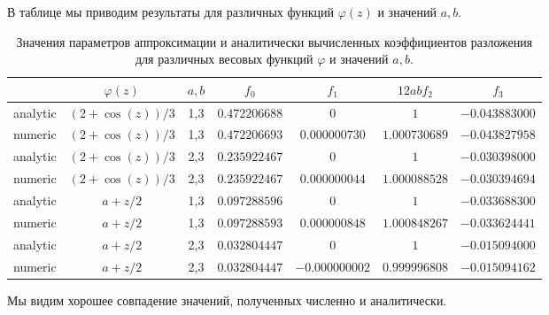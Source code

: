 \documentclass{article}
\begin{document}
В таблице мы приводим результаты для различных функций  $\varphi(z)$ и значений $a,b$.
\begin{table}[htpb]
\begin{center}
\begin{tabular}{c|cccccc}
  & $\varphi(z)$ & $a,b$ & $f_{0}$ &  $f_{1}$ &  $12ab f_{2}$ &  $f_{3}$ \\
 \hline
 analytic & $(2+\cos(z))/3$ & 1,3 & $0.472206688$ & $0$ & $1$&$-0.043883000$\\
 numeric & $(2+\cos(z))/3$ & 1,3 &  $0.472206693$ & $0.000000730$ & $1.000730689$&$-0.043827958$\\
  \hline
 analytic & $(2+\cos(z))/3$ & 2,3 & $0.235922467$ & $0$ & $1$&$-0.030398000$\\
 numeric & $(2+\cos(z))/3$ & 2,3 &  $0.235922467$ & $0.000000044$ & $1.000088528$&$-0.030394694$\\
\hline                                                
 analytic & $a+z/2$ & 1,3 & $0.097288596$ & $0$ & $1$&$-0.033688300$\\
 numeric & $a+z/2$ & 1,3 &  $0.097288593$ & $0.000000848$ & $1.000848267$&$-0.033624441$\\
\hline                                                
 analytic & $a+z/2$ & 2,3 & $0.032804447$ & $0$ & $1$&$-0.015094000$\\
 numeric & $a+z/2$ & 2,3 &  $0.032804447$ & $-0.000000002$ & $0.999996808$&$-0.015094162$\\
\end{tabular}
\caption{Значения параметров аппроксимации и аналитически вычисленных коэффициентов разложения для
  различных весовых функций $\varphi$ и значений $a,b$.
}
\label{tttt1}
\end{center}
\end{table}

Мы видим хорошее совпадение значений, полученных численно и аналитически. 

\end{document}

